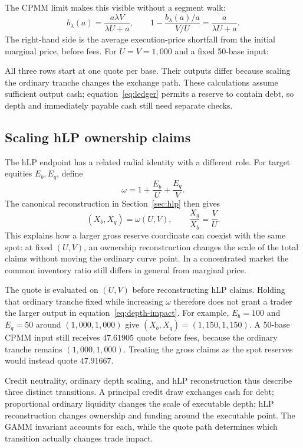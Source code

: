 The CPMM limit makes this visible without a segment walk:
\begin{equation}
b_\lambda(a)=\frac{a\lambda V}{\lambda U+a},\qquad
1-\frac{b_\lambda(a)/a}{V/U}=\frac{a}{\lambda U+a}.
\label{eq:depth-impact}
\end{equation}
The right-hand side is the average execution-price shortfall from the initial marginal price, before fees. For $U=V=1{,}000$ and a fixed 50-base input:


All three rows start at one quote per base. Their outputs differ because scaling the ordinary tranche changes the exchange path. These calculations assume sufficient output cash; equation~\eqref{eq:ledger} permits a reserve to contain debt, so depth and immediately payable cash still need separate checks.

\subsection{Scaling hLP ownership claims}

The hLP endpoint has a related radial identity with a different role. For target equities $E_b,E_q$, define
\begin{equation}
\omega=1+\frac{E_b}{U}+\frac{E_q}{V}.
\end{equation}
The canonical reconstruction in Section~\ref{sec:hlp} then gives
\begin{equation}
(X_b,X_q)=\omega(U,V),\qquad \frac{X_q}{X_b}=\frac VU.
\label{eq:ownership-radial}
\end{equation}
This explains how a larger gross reserve coordinate can coexist with the same spot: at fixed $(U,V)$, an ownership reconstruction changes the scale of the total claims without moving the ordinary curve point. In a concentrated market the common inventory ratio still differs in general from marginal price.

The quote is evaluated on $(U,V)$ before reconstructing hLP claims. Holding that ordinary tranche fixed while increasing $\omega$ therefore does not grant a trader the larger output in equation~\eqref{eq:depth-impact}. For example, $E_b=100$ and $E_q=50$ around $(1{,}000,1{,}000)$ give $(X_b,X_q)=(1{,}150,1{,}150)$. A 50-base CPMM input still receives $47.61905$ quote before fees, because the ordinary tranche remains $(1{,}000,1{,}000)$. Treating the gross claims as the spot reserves would instead quote $47.91667$.

Credit neutrality, ordinary depth scaling, and hLP reconstruction thus describe three distinct transitions. A principal credit draw exchanges cash for debt; proportional ordinary liquidity changes the scale of executable depth; hLP reconstruction changes ownership and funding around the executable point. The GAMM invariant accounts for each, while the quote path determines which transition actually changes trade impact.

